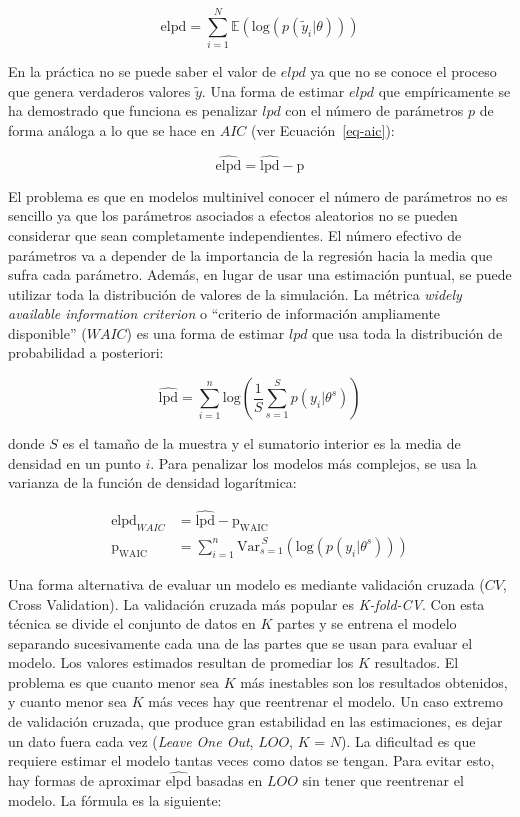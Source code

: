 \documentclass[
  12pt,
  a4paper,
  extrafontsizes,
  onecolumn,
  openright,
  table]{memoir}
\begin{document}
\[
\mathrm{elpd} = \sum_{i=1}^{N} \mathbb{E}(\mathrm{log} (p(\tilde{y}_i | \theta)))
\]

En la práctica no se puede saber el valor de \(elpd\) ya que no se
conoce el proceso que genera verdaderos valores \(\tilde{y}\). Una forma
de estimar \(elpd\) que empíricamente se ha demostrado que funciona es
penalizar \(lpd\) con el número de parámetros \(p\) de forma análoga a
lo que se hace en \(AIC\) (ver Ecuación~\ref{eq-aic}):

\[
\widehat{\mathrm{elpd}} = \widehat{\mathrm{lpd}} - \mathrm{p}
\]

El problema es que en modelos multinivel conocer el número de parámetros
no es sencillo ya que los parámetros asociados a efectos aleatorios no
se pueden considerar que sean completamente independientes. El número
efectivo de parámetros va a depender de la importancia de la regresión
hacia la media que sufra cada parámetro. Además, en lugar de usar una
estimación puntual, se puede utilizar toda la distribución de valores de
la simulación. La métrica \emph{widely available information criterion}
o \enquote{criterio de información ampliamente disponible} (\(WAIC\)) es
una forma de estimar \(lpd\) que usa toda la distribución de
probabilidad a posteriori:

\[
\widehat{\mathrm{lpd}} = \sum_{i=1}^{n} \mathrm{log} (\frac{1}{S} \sum_{s=1}^{S} p(y_{i} | \theta^s))
\]

donde \(S\) es el tamaño de la muestra y el sumatorio interior es la
media de densidad en un punto \(i\). Para penalizar los modelos más
complejos, se usa la varianza de la función de densidad logarítmica:

\[
\begin{aligned}
\widehat{\mathrm{elpd}}_{WAIC} &= \widehat{\mathrm{lpd}} - \mathrm{p_{WAIC}} \\
\mathrm{p_{\mathrm{WAIC}}} &= \sum_{i=1}^{n} \mathrm{Var}_{s=1}^{\,S}(\mathrm{log} (p(y_{i} | \theta^s)))
\end{aligned}
\]

Una forma alternativa de evaluar un modelo es mediante validación
cruzada (\(CV\), Cross Validation). La validación cruzada más popular es
\emph{K-fold-CV}. Con esta técnica se divide el conjunto de datos en
\(K\) partes y se entrena el modelo separando sucesivamente cada una de
las partes que se usan para evaluar el modelo. Los valores estimados
resultan de promediar los \(K\) resultados. El problema es que cuanto
menor sea \(K\) más inestables son los resultados obtenidos, y cuanto
menor sea \(K\) más veces hay que reentrenar el modelo. Un caso extremo
de validación cruzada, que produce gran estabilidad en las estimaciones,
es dejar un dato fuera cada vez (\emph{Leave One Out}, \(LOO\), \(K\) =
\(N\)). La dificultad es que requiere estimar el modelo tantas veces
como datos se tengan. Para evitar esto, hay formas de aproximar
\(\widehat{\mathrm{elpd}}\) basadas en \(LOO\) sin tener que reentrenar
el modelo. La fórmula es la siguiente:
\end{document}

